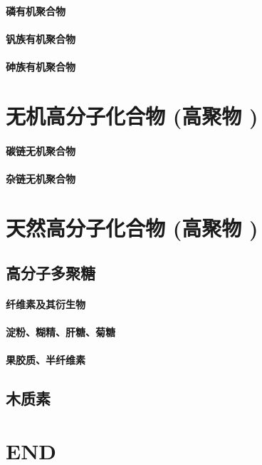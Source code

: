 \documentclass[UTF8]{../03-Chemistry}
\begin{document}
    \subsubsection{磷有机聚合物}
    \subsubsection{钒族有机聚合物}
    \subsubsection{砷族有机聚合物}








\chapter{无机高分子化合物 (高聚物 )}
\subsubsection{碳链无机聚合物}
\subsubsection{杂链无机聚合物}








\chapter{天然高分子化合物 (高聚物 )}
\section{高分子多聚糖}
    \subsubsection{纤维素及其衍生物}
    \subsubsection{淀粉、糊精、肝糖、菊糖}
    \subsubsection{果胶质、半纤维素}
\section{木质素}


\chapter{END}
\end{document}
